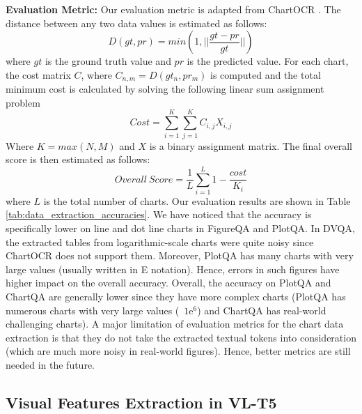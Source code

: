 \textbf{Evaluation Metric:} Our evaluation metric is adapted from ChartOCR \cite{ChartOCR}. The distance between any two data values is estimated as follows:
\[
D(gt, pr) = min(1, ||\frac{gt - pr}{gt}||)
\]
where $gt$ is the ground truth value and $pr$ is the predicted value. For each chart, the cost matrix $C$, where $C_{n,m} = D(gt_n, pr_m)$ is computed and the total minimum cost is calculated by solving the following linear sum assignment problem
\[
Cost = \sum_{i=1}^{K}{\sum_{j=1}^{K}{C_{i, j} X_{i,j}}}
\]
Where $K = max(N, M)$ and $X$ is a binary assignment matrix. The final overall score is then estimated as follows:
\[
Overall \ Score = \frac{1}{L}\sum_{i=1}^{L}{1 - \frac{cost}{K_i}}
\]
where $L$ is the total number of charts. Our evaluation results are shown in Table \ref{tab:data_extraction_accuracies}. We have noticed that the accuracy is specifically lower on line and dot line charts in FigureQA and PlotQA. In DVQA, the extracted tables from logarithmic-scale charts were quite noisy since ChartOCR does not support them. Moreover, PlotQA has many charts with very large values (usually written in E notation). Hence, errors in such figures have higher impact on the overall accuracy. Overall, the accuracy on PlotQA and ChartQA are generally lower since they have more complex charts (PlotQA has numerous charts with very large values (\eg\ $1\mathrm{e}^{6}$) and ChartQA has real-world challenging charts). A major limitation of evaluation metrics for the chart data extraction is that they do not take the extracted textual tokens into consideration (which are much more noisy in real-world figures). Hence, better metrics are still needed in the future.  
\begin{table}[h!]
\centering
{}
\caption{
    Accuracies of our data extraction algorithm on the test sets of DVQA, PlotQA, and ChartQA. Since the gold data table is not available in FigureQA, we report the results on the Validation2 set.
}
\label{tab:data_extraction_accuracies}
\end{table}

\subsection{Visual Features Extraction in VL-T5} 
\label{app:maskrcnn}
